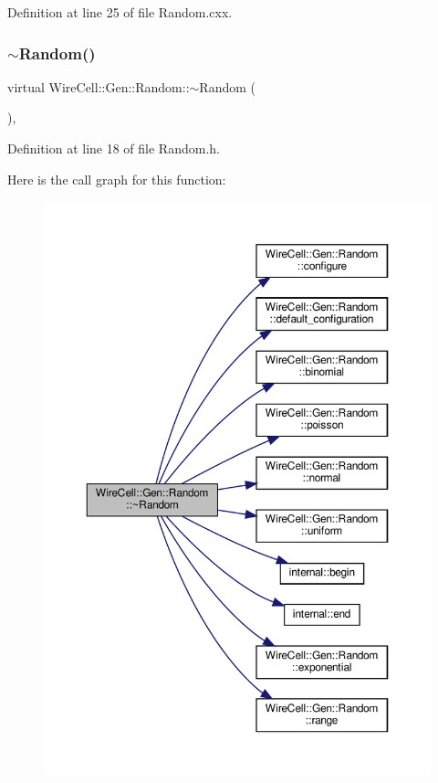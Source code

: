 Definition at line 25 of file Random.\+cxx.

\mbox{\label{class_wire_cell_1_1_gen_1_1_random_a25d7fa1d2b2a1dbb64964acbe5162d95}} 
\subsubsection{\texorpdfstring{$\sim$\+Random()}{~Random()}}
{\footnotesize\ttfamily virtual Wire\+Cell\+::\+Gen\+::\+Random\+::$\sim$\+Random (\begin{DoxyParamCaption}{ }\end{DoxyParamCaption})\hspace{0.3cm}{\ttfamily [inline]}, {\ttfamily [virtual]}}



Definition at line 18 of file Random.\+h.

Here is the call graph for this function\+:
\nopagebreak
\begin{figure}[H]
\begin{center}
\leavevmode
\includegraphics[width=350pt]{class_wire_cell_1_1_gen_1_1_random_a25d7fa1d2b2a1dbb64964acbe5162d95_cgraph}
\end{center}
\end{figure}


